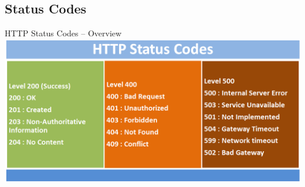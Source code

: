\documentclass[presentation]{beamer}\mode<presentation>{\usetheme{AMSCesenaPurpleAndGold}}
\begin{document}
\subsection{Status Codes}

\begin{frame}{HTTP Status Codes -- Overview}
    \includegraphics[width=\linewidth]{img/http_status_codes.png}
\end{frame}
\end{document}
